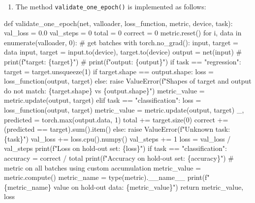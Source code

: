 \documentclass[
  letterpaper,
  DIV=11,
  numbers=noendperiod]{scrreprt}
\newenvironment{Shaded}{\begin{snugshade}}{\end{snugshade}}
\newcommand{\NormalTok}[1]{\textcolor[rgb]{0.00,0.23,0.31}{#1}}
\providecommand{\tightlist}{%
  \setlength{\itemsep}{0pt}\setlength{\parskip}{0pt}}\usepackage{longtable,booktabs,array}
\begin{document}
\begin{enumerate}
\def\labelenumi{\arabic{enumi}.}
\setcounter{enumi}{4}
\tightlist
\item
  The method \texttt{validate\_one\_epoch()} is implemented as follows:
\end{enumerate}

\begin{Shaded}
\begin{Highlighting}[]
\NormalTok{def validate\_one\_epoch(net, valloader, loss\_function, metric, device, task):}
\NormalTok{    val\_loss = 0.0}
\NormalTok{    val\_steps = 0}
\NormalTok{    total = 0}
\NormalTok{    correct = 0}
\NormalTok{    metric.reset()}
\NormalTok{    for i, data in enumerate(valloader, 0):}
\NormalTok{        \# get batches}
\NormalTok{        with torch.no\_grad():}
\NormalTok{            input, target = data}
\NormalTok{            input, target = input.to(device), target.to(device)}
\NormalTok{            output = net(input)}
\NormalTok{            \# print(f"target: \{target\}")}
\NormalTok{            \# print(f"output: \{output\}")}
\NormalTok{            if task == "regression":}
\NormalTok{                target = target.unsqueeze(1)}
\NormalTok{                if target.shape == output.shape:}
\NormalTok{                    loss = loss\_function(output, target)}
\NormalTok{                else:}
\NormalTok{                    raise ValueError(f"Shapes of target and output }
\NormalTok{                        do not match: \{target.shape\} vs \{output.shape\}")}
\NormalTok{                metric\_value = metric.update(output, target)}
\NormalTok{            elif task == "classification":}
\NormalTok{                loss = loss\_function(output, target)}
\NormalTok{                metric\_value = metric.update(output, target)}
\NormalTok{                \_, predicted = torch.max(output.data, 1)}
\NormalTok{                total += target.size(0)}
\NormalTok{                correct += (predicted == target).sum().item()}
\NormalTok{            else:}
\NormalTok{                raise ValueError(f"Unknown task: \{task\}")}
\NormalTok{            val\_loss += loss.cpu().numpy()}
\NormalTok{            val\_steps += 1}
\NormalTok{    loss = val\_loss / val\_steps}
\NormalTok{    print(f"Loss on hold{-}out set: \{loss\}")}
\NormalTok{    if task == "classification":}
\NormalTok{        accuracy = correct / total}
\NormalTok{        print(f"Accuracy on hold{-}out set: \{accuracy\}")}
\NormalTok{    \# metric on all batches using custom accumulation}
\NormalTok{    metric\_value = metric.compute()}
\NormalTok{    metric\_name = type(metric).\_\_name\_\_}
\NormalTok{    print(f"\{metric\_name\} value on hold{-}out data: \{metric\_value\}")}
\NormalTok{    return metric\_value, loss}
\end{Highlighting}
\end{Shaded}
\end{document}
